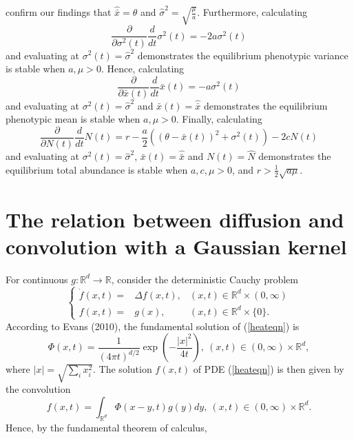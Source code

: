 \documentclass[]{article}
\begin{document}
confirm our findings that \(\hat{\bar x}=\theta\) and
\(\hat\sigma^2=\sqrt{\frac{\mu}{a}}\). Furthermore, calculating
\begin{equation}
\frac{\partial}{\partial\sigma^2(t)}\frac{d}{dt}\sigma^2(t)=-2a\sigma^2(t)
\end{equation} and evaluating at \(\sigma^2(t)=\hat\sigma^2\)
demonstrates the equilibrium phenotypic variance is stable when
\(a,\mu>0\). Hence, calculating \begin{equation}
\frac{\partial}{\partial\bar x(t)}\frac{d}{dt}\bar x(t)=-a\sigma^2(t)
\end{equation} and evaluating at \(\sigma^2(t)=\hat\sigma^2\) and
\(\bar x(t)=\hat{\bar x}\) demonstrates the equilibrium phenotypic mean
is stable when \(a,\mu>0\). Finally, calculating \begin{equation}
\frac{\partial}{\partial N(t)}\frac{d}{dt}N(t)=r-\frac{a}{2}((\theta-\bar x(t))^2+\sigma^2(t))-2cN(t)
\end{equation} and evaluating at \(\sigma^2(t)=\hat\sigma^2\),
\(\bar x(t)=\hat{\bar x}\) and \(N(t)=\hat N\) demonstrates the
equilibrium total abundance is stable when \(a,c,\mu>0\), and
\(r>\frac{1}{2}\sqrt{a\mu}\).

\hypertarget{the-relation-between-diffusion-and-convolution-with-a-gaussian-kernel}{%
\section{\texorpdfstring{The relation between diffusion and convolution
with a Gaussian kernel
\label{diffconvequiv}}{The relation between diffusion and convolution with a Gaussian kernel }}\label{the-relation-between-diffusion-and-convolution-with-a-gaussian-kernel}}

For continuous \(g:\mathbb{R}^d\to\mathbb{R}\), consider the
deterministic Cauchy problem \begin{equation}\label{heateqn}
\left\{\begin{matrix}
\dot f(x,t)=&\Delta f(x,t), & (x,t)\in\mathbb{R}^d\times(0,\infty)\\
f(x,t)=&g(x), & (x,t)\in\mathbb{R}^d\times\{0\}.
\end{matrix}\right.
\end{equation} According to Evans (2010), the fundamental solution of
(\ref{heateqn}) is \begin{equation}
\Phi(x,t)=\frac{1}{(4\pi t)^{d/2}}\exp\left(-\frac{|x|^2}{4t}\right), \ (x,t)\in(0,\infty)\times\mathbb{R}^d,
\end{equation} where \(|x|=\sqrt{\sum_ix_i^2}\). The solution \(f(x,t)\)
of PDE (\ref{heateqn}) is then given by the convolution \begin{equation}
f(x,t)=\int_{\mathbb{R}^d}\Phi(x-y,t)g(y)dy, \ (x,t)\in(0,\infty)\times\mathbb{R}^d.
\end{equation} Hence, by the fundamental theorem of calculus,
\end{document}

